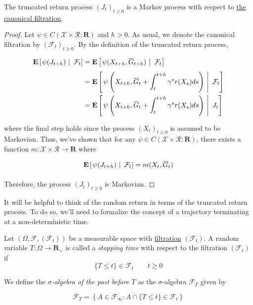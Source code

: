 \begin{proposition}\label{pro:markov}
  The truncated return process $(J_t)_{t\geq 0}$ is a Markov process
  with respect to \hyperref[def:canonical-filtration]{the canonical filtration}.
\end{proposition}
\begin{proof}
  Let $\psi\in C(\mathcal{X}\times\mathcal{R};\mathbf{R})$ and $h>0$. As usual,
  we denote the canonical filtration by $(\mathcal{F}_t)_{t\geq 0}$.
  By the definition of the truncated return process,

  \begin{equation*}
    \begin{aligned}
      \underset{}{\mathbf{E}}\left[\left. \psi(J_{t+h})\ \right\rvert\ \mathcal{F}_t\right] &=
      \underset{}{\mathbf{E}}\left[\left. \psi(X_{t+h}, \overline{G}_{t+h})\ \right\rvert\ \mathcal{F}_t\right]\\
      &= \underset{}{\mathbf{E}}\left[\left. \psi\left(X_{t+h}, \overline{G}_t + \int_t^{t+h}\gamma^sr(X_s)ds\right)\ \right\rvert\ \mathcal{F}_t\right]\\
      &= \underset{}{\mathbf{E}}\left[\left. \psi\left(X_{t+h}, \overline{G}_t + \int_t^{t+h}\gamma^sr(X_s)ds\right)\ \right\rvert\ J_t\right]\\
    \end{aligned}
  \end{equation*}

  where the final step holds since the process $(X_t)_{t\geq 0}$ is
  assumed to be Markovian. Thus, we've shown that for any $\psi\in
  C(\mathcal{X}\times\mathcal{R};\mathbf{R})$, there exists a function
  $m:\mathcal{X}\times\mathcal{R}\to\mathbf{R}$ where

  \begin{equation*}
    \underset{}{\mathbf{E}}\left[\left. \psi(J_{t+h})\ \right\rvert\ \mathcal{F}_t\right] = m(X_t, \overline{G}_t)
  \end{equation*}

  Therefore, the process $(J_t)_{t\geq 0}$ is Markovian.
\end{proof}

It will be helpful to think of the random return in terms of the
truncated return process. To do so, we'll need to formalize the
concept of a trajectory terminating at a non-deterministic time.

\begin{definition}\label{def:stopping-time}
  Let $(\Omega, \mathcal{F}, (\mathcal{F}_t))$ be a measurable space
  with \hyperref[def:filtration]{filtration} $(\mathcal{F}_t)$. A random variable
  $T:\Omega\to\mathbf{R}_+$ is called a \emph{stopping time} with
  respect to the filtration $(\mathcal{F}_t)$ if
  \begin{equation*}
    \{T\leq t\} \in\mathcal{F}_t\qquad t\geq 0
  \end{equation*}

  We define the \emph{$\sigma$-algebra of the past before $T$} as the
  $\sigma$-algebra $\mathcal{F}_T$ given by

  \begin{equation*}
    \mathcal{F}_T = \left\{A\in\mathcal{F}_\infty : A\cap\{T\leq t\}\in\mathcal{F}_t\right\}
  \end{equation*}
\end{definition}

